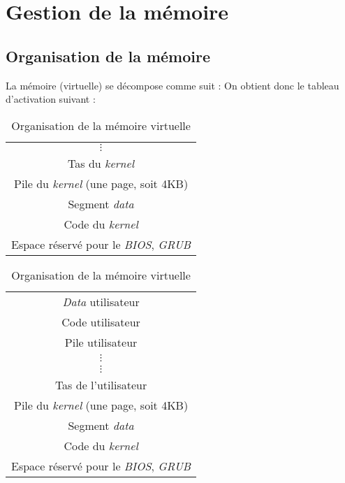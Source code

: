 \documentclass[a4paper, 10pt, french]{article}
\newcommand{\foreign}[1]{\emph{#1}}
\begin{document}
\clearpage
\section{Gestion de la mémoire}

\subsection{Organisation de la mémoire}

La mémoire (virtuelle) se décompose comme suit :
On obtient donc le tableau d'activation suivant :
\begin{table}[H]
 \centering
 \begin{subtable}[h]{.5\linewidth}
 \centering
 \begin{tabular}{|c|}
 \hline
 $\vdots$ \\
 Tas du \foreign{kernel} \\
 \hline
 Pile du \foreign{kernel} (une page, soit 4KB) \\
 Segment \foreign{data} \\
 Code du \foreign{kernel} \\
 \hline
 Espace réservé pour le \foreign{BIOS}, \foreign{GRUB} \\
 \hline
\end{tabular}
\caption{Espace mémoire du noyau}
\end{subtable}


\begin{subtable}[h]{.5\linewidth}
 \centering
 \begin{tabular}{|c|}
  \hline
 \foreign{Data} utilisateur \\
 Code utilisateur \\
 \hline
 Pile utilisateur \\
 $\vdots$ \\
 \hline
 $\vdots$ \\
 Tas de l'utilisateur \\
 \hline
 Pile du \foreign{kernel} (une page, soit 4KB) \\
 Segment \foreign{data} \\
 Code du \foreign{kernel} \\
 \hline
 Espace réservé pour le \foreign{BIOS}, \foreign{GRUB} \\
 \hline
 \end{tabular}

 \caption{Espace mémoire de l'utilisateur}
\end{subtable}
\caption{Organisation de la mémoire virtuelle}
\end{table}
\end{document}
